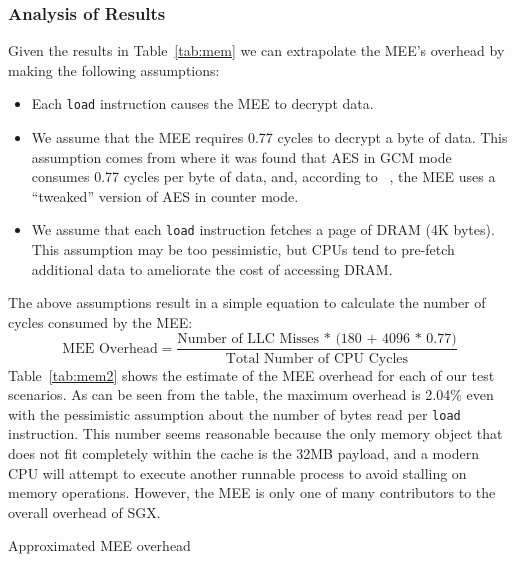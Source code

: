 \documentclass[../../../main.tex]{subfiles}
\begin{document}
\subsubsection*{Analysis of Results}
Given the results in Table~\ref{tab:mem} we can extrapolate the MEE's
overhead by making the following assumptions:
\begin{itemize}
  \item Each \texttt{load} instruction causes the MEE to decrypt data.
  \item We assume that the MEE requires 0.77 cycles to decrypt a byte of data.
    This assumption comes from \cite{cyclesaes} where it was found that
    AES in GCM mode consumes 0.77 cycles per byte of data, and, according to
    ~\Intel, the MEE uses a ``tweaked'' version of AES in counter mode.
  \item We assume that each \texttt{load} instruction fetches a page
    of DRAM (4K bytes). This assumption may be too pessimistic, but CPUs
    tend to pre-fetch additional data to ameliorate the cost of accessing
    DRAM.
\end{itemize}
The above assumptions result in a simple equation to calculate the number
of cycles consumed by the MEE:
\begin{equation*}
  \text{MEE Overhead} = \frac{\text{Number of LLC Misses
    * (180 + 4096 * 0.77)}}{\text{Total Number of CPU Cycles}}
\end{equation*}
Table~\ref{tab:mem2} shows the estimate of the MEE overhead for each
of our test scenarios. As can be seen from the table, the maximum
overhead is 2.04\% even with the pessimistic assumption about the
number of bytes read per \texttt{load} instruction. This number seems
reasonable because the only memory object that does not fit completely
within the cache is the 32MB payload, and a modern CPU will attempt to
execute another runnable process to avoid stalling on memory
operations. However, the MEE is only one of many contributors to the
overall overhead of SGX.

\begin{table}[H]
  \caption{Approximated MEE overhead}
  \label{tab:mem2}
\end{table}
\end{document}
